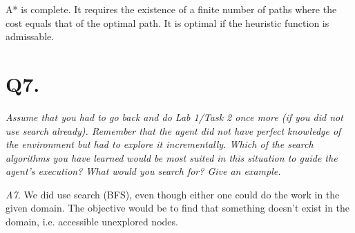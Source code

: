     A* is complete. It requires the existence of a finite number of paths where the cost equals that of the
    optimal path. It is optimal if the heuristic function is admissable.
    
\section{Q7.}
\em Assume that you had to go back and do Lab 1/Task 2 once more (if you did not use search already).
    Remember that the agent did not have perfect knowledge of the environment but had to explore it
    incrementally. Which of the search algorithms you have learned would be most suited in this situation
    to guide the agent's execution? What would you search for? Give an example.\em

    \emph{A7.}
    We did use search (BFS), even though either one could do the work in the given domain. The objective
    would be to find that something doesn't exist in the domain, i.e. accessible unexplored nodes.
